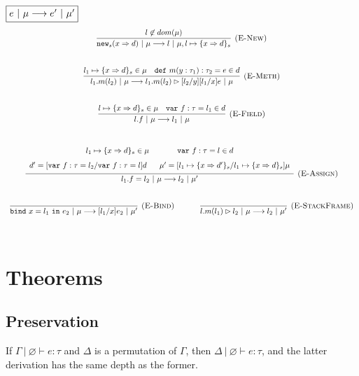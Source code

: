 \documentclass{llncs}
\newcommand{\keywadj}[1]{\mathtt{#1}}
\newcommand{\keyw}[1]{\keywadj{#1}~}
\begin{document}
$\fbox{$e~|~\mu \longrightarrow e'~|~\mu'$}$
\[
\begin{array}{c}
\infer[\textsc{(E-New)}]
  {\keywadj{new}_{s}(x \Rightarrow d)~|~\mu \longrightarrow l~|~\mu, l \mapsto \{ x \Rightarrow d \}_{s}}
  {l \not\in dom(\mu)}\\[5ex]

\infer[\textsc{(E-Meth)}]
  {l_1.m(l_2)~|~\mu \longrightarrow l_1.m(l_2) \rhd [l_2/y][l_1/x]e~|~\mu}
  {l_1 \mapsto \{ x \Rightarrow d \}_{s} \in \mu & \keyw{def} m(y : \tau_1) : \tau_2 = e \in d}\\[5ex]

\infer[\textsc{(E-Field)}]
  {l.f~|~\mu \longrightarrow l_1~|~\mu}
  {l \mapsto \{ x \Rightarrow d \}_{s} \in \mu & \keyw{var} f:\tau = l_1 \in d}\\[5ex]

\infer[\textsc{(E-Assign)}]
  {l_1.f = l_2~|~\mu \longrightarrow l_2~|~\mu'}
  {\def\arraystretch{1.6}
  \begin{array}{c}
l_1 \mapsto \{ x \Rightarrow d \}_{s} \in \mu~~~~~~~~~~~\keyw{var} f:\tau = l \in d \\
d' = [\keyw{var} f:\tau = l_2/\keyw{var} f:\tau = l]d~~~~~\mu' = [l_1 \mapsto \{ x \Rightarrow d' \}_{s}/l_1 \mapsto \{ x \Rightarrow d \}_{s}]\mu
  \end{array}}\\[5ex]

\infer[\textsc{(E-Bind)}]
  {\keyw{bind} x = l_1~\keyw{in} e_2~|~\mu \longrightarrow [l_1/x]e_2~|~\mu'}
  {}%
~~~~~~~~~~
\infer[\textsc{(E-StackFrame)}]
  {l.m(l_1) \rhd l_2~|~\mu \longrightarrow l_2~|~\mu'}
  {}\\[5ex]
  
\end{array}
\]

\newpage

\section{Theorems}

\subsection{Preservation}

\begin{lemma}[Permutation]
If $\Gamma~|~\varnothing \vdash e : \tau$ and $\Delta$ is a permutation of $\Gamma$, then $\Delta~|~\varnothing \vdash e : \tau$, and the latter derivation has the same depth as the former.
\end{lemma}
\end{document}
